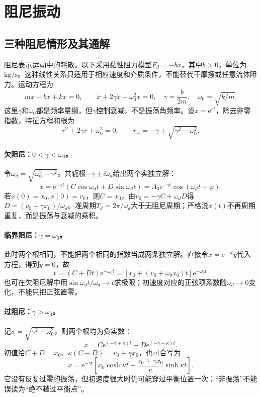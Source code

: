 \section{阻尼振动}\label{ch10:sec:damping}
\subsection{三种阻尼情形及其通解}
阻尼表示运动中的耗散。以下采用黏性阻力模型$F_d=-b\dot x$，其中$b>0$，单位为$\mathrm{kg/s}$。这种线性关系只适用于相应速度和介质条件，不能替代干摩擦或任意流体阻力。运动方程为
\begin{equation}\label{ch10:eq:damping}
 m\ddot x+b\dot x+kx=0,
 \qquad\ddot x+2\gamma\dot x+\omega_0^2x=0,
 \quad\gamma=\frac{b}{2m},\quad\omega_0=\sqrt{k/m}.
\end{equation}
这里$\gamma$和$\omega_0$都是频率量纲，但$\gamma$控制衰减，不是振荡角频率。设$x=\mathrm e^{rt}$，除去非零指数，特征方程和根为
\[
 r^2+2\gamma r+\omega_0^2=0,
 \qquad r_\pm=-\gamma\pm\sqrt{\gamma^2-\omega_0^2}.
\]
\paragraph{欠阻尼：$0<\gamma<\omega_0$。}
令$\omega_d=\sqrt{\omega_0^2-\gamma^2}$。共轭根$-\gamma\pm\ii\omega_d$给出两个实独立解：
\begin{equation}\label{ch10:eq:under}
 x=\mathrm e^{-\gamma t}(C\cos\omega_dt+D\sin\omega_dt)
 =A_0\mathrm e^{-\gamma t}\cos(\omega_dt+\varphi).
\end{equation}
若$x(0)=x_0,\dot x(0)=v_0$，则$C=x_0$，由$v_0=-\gamma C+\omega_dD$得$D=(v_0+\gamma x_0)/\omega_d$。准周期$T_d=2\pi/\omega_d$大于无阻尼周期；严格说$x(t)$不再周期重复，而是振荡与衰减的乘积。

\paragraph{临界阻尼：$\gamma=\omega_0$。}
此时两个根相同，不能把两个相同的指数当成两条独立解。直接令$x=\mathrm e^{-\gamma t}y$代入方程，得到$\ddot y=0$，故
\begin{equation}\label{ch10:eq:critical}
 x=(C+Dt)\mathrm e^{-\omega_0t}
 =[x_0+(v_0+\omega_0x_0)t]\mathrm e^{-\omega_0t}.
\end{equation}
也可在欠阻尼解中用$\sin\omega_dt/\omega_d\to t$求极限；初速度对应的正弦项系数随$\omega_d\to0$变化，不能只把正弦置零。

\paragraph{过阻尼：$\gamma>\omega_0$。}
记$\kappa=\sqrt{\gamma^2-\omega_0^2}$，则两个根均为负实数：
\begin{equation}\label{ch10:eq:over}
 x=C\mathrm e^{(-\gamma+\kappa)t}+D\mathrm e^{(-\gamma-\kappa)t}.
\end{equation}
初值给$C+D=x_0$、$\kappa(C-D)=v_0+\gamma x_0$，也可合写为
\[
 x=\mathrm e^{-\gamma t}\left[x_0\cosh\kappa t+
 \frac{v_0+\gamma x_0}{\kappa}\sinh\kappa t\right].
\]
它没有反复过零的振荡，但初速度很大时仍可能穿过平衡位置一次；“非振荡”不能误读为“绝不越过平衡点”。

